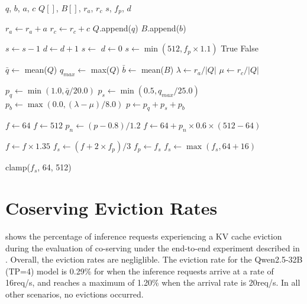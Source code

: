 \begin{algorithm}[htbp]
\label{alg:dts}
\caption{Dynamic Temporal Sharing}
\begin{algorithmic}[1]
\Require $q$, $b$, $a$, $c$
\State $Q[]$, $B[]$, $r_a$, $r_c$
\State $s$, $f_p$, $d$

    \State $r_a \leftarrow r_a + a$
    \State $r_c \leftarrow r_c + c$
    \State $Q$.append($q$)
    \State $B$.append($b$)
    
    \State $s \leftarrow s - 1$
        \State $d \leftarrow d + 1$
            \State $s \leftarrow$ 
            \State $d \leftarrow 0$
        \Else
            \State $s \leftarrow \min(512, f_p \times 1.1)$
        \EndIf
        \State {}
        \State \Return True 
    \EndIf
    \State \Return False 
\EndProcedure

        \State {}
    \EndIf
    
    \State $\bar{q} \leftarrow$ mean($Q$)
    \State $q_{max} \leftarrow$ max($Q$)
    \State $\bar{b} \leftarrow$ mean($B$)
    \State $\lambda \leftarrow r_a / |Q|$
    \State $\mu \leftarrow r_c / |Q|$
    
    \State $p_q \leftarrow \min(1.0, \bar{q} / 20.0)$
    \State $p_s \leftarrow \min(0.5, q_{max} / 25.0)$
    \State $p_b \leftarrow \max(0.0, (\lambda - \mu) / 8.0)$
    \State $p \leftarrow p_q + p_s + p_b$
    
        \State $f \leftarrow 64$
        \State $f \leftarrow 512$
    \Else
        \State $p_n \leftarrow (p - 0.8) / 1.2$
        \State $f \leftarrow 64 + p_n \times 0.6 \times (512 - 64)$
    \EndIf
    
    \State $f \leftarrow f \times 1.35$ 
    \State $f_s \leftarrow (f + 2 \times f_p) / 3$
    \State $f_p \leftarrow f_s$
    \State $f_s \leftarrow \max(f_s, 64 + 16)$
    
    \State \Return clamp($f_s$, 64, 512)
\EndProcedure
\end{algorithmic}
\end{algorithm}

\section{Coserving Eviction Rates}
\label{sec:coserving_evictions}
 shows the percentage of inference requests experiencing a KV cache eviction during the evaluation of co-serving under the end-to-end experiment described in . Overall, the eviction rates are negliglible. The eviction rate for the Qwen2.5-32B (TP=4) model is 0.29\% for when the inference requests arrive at a rate of 16req/s, and reaches a maximum of 1.20\% when the arrival rate is 20req/s. In all other scenarios, no evictions occurred.

